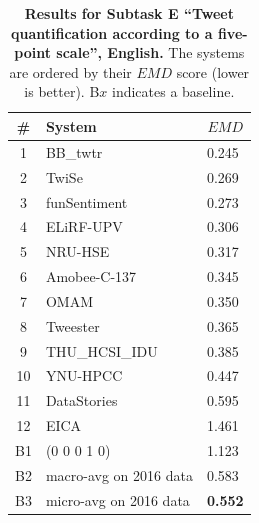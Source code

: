 \begin{table}[h!]
\centering
\begin{small}
\renewcommand{\arraystretch}{1.0}%
\begin{tabular}{|c|l|l|}
\hline
      \bf \# & \bf System & \multicolumn{1}{c|}{$EMD$} \\
\hline
1 & BB\_twtr & 0.245 \\
2 & TwiSe & 0.269 \\
3 & funSentiment & 0.273 \\
4 & ELiRF-UPV & 0.306 \\
5 & NRU-HSE & 0.317 \\
6 & Amobee-C-137 & 0.345 \\
7 & OMAM & 0.350 \\
8 & Tweester & 0.365 \\
9 & THU\_HCSI\_IDU & 0.385 \\
10 & YNU-HPCC & 0.447 \\
11 & DataStories & 0.595 \\
12 & EICA & 1.461 \\
\hline
B1 & (0 0 0 1 0) & 1.123\\
B2 & macro-avg on 2016 data & 0.583\\
B3 & micro-avg on 2016 data & \bf 0.552\\
\hline
\end{tabular}
\caption{\textbf{Results for Subtask E ``Tweet quantification according to a five-point scale'', English.} The systems are ordered by their $EMD$ score (lower is better). B$x$ indicates a baseline.}
\label{table:ResultsSubtaskE:English}
\end{small}
\end{table}
